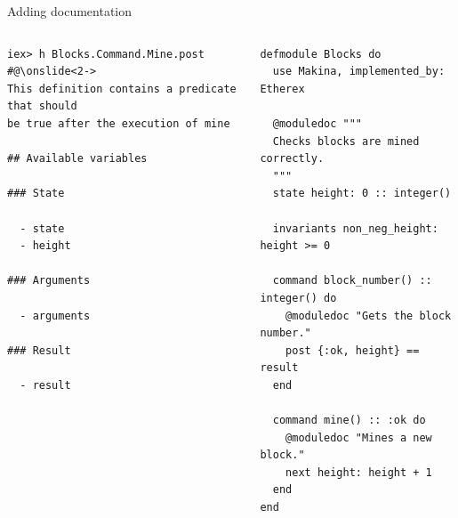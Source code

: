 \documentclass[aspectratio=169, 10pt, handout]{beamer}
\begin{document}
\begin{frame}[label={sec:orgfb6acf8},fragile]{Adding documentation}
 \begin{columns}
\begin{column}{0.48\columnwidth}
\lstset{language=bash,label= ,caption= ,captionpos=b,numbers=none,style=shell}
\begin{lstlisting}
iex> h Blocks.Command.Mine.post
#@\onslide<2->
This definition contains a predicate that should
be true after the execution of mine

## Available variables

### State

  - state
  - height

### Arguments

  - arguments

### Result

  - result
\end{lstlisting}
\end{column}

\begin{column}{0.48\columnwidth}
\lstset{language=elixir,label= ,caption= ,captionpos=b,numbers=none,style=display}
\begin{lstlisting}
defmodule Blocks do
  use Makina, implemented_by: Etherex

  @moduledoc """
  Checks blocks are mined correctly.
  """
  state height: 0 :: integer()

  invariants non_neg_height: height >= 0

  command block_number() :: integer() do
    @moduledoc "Gets the block number."
    post {:ok, height} == result
  end

  command mine() :: :ok do
    @moduledoc "Mines a new block."
    next height: height + 1
  end
end
\end{lstlisting}
\end{column}
\end{columns}
\end{frame}
\end{document}
